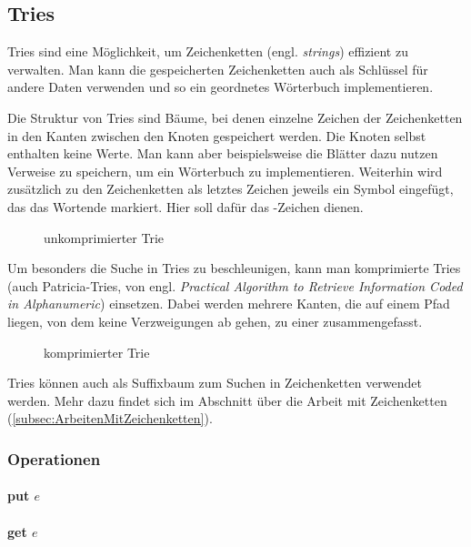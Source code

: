 \subsection{Tries}
\label{subsec:Tries}

Tries sind eine Möglichkeit, um Zeichenketten (engl. \textit{strings}) effizient zu verwalten.
Man kann die gespeicherten Zeichenketten auch als Schlüssel für andere Daten verwenden und so ein geordnetes Wörterbuch implementieren.

Die Struktur von Tries sind Bäume, bei denen einzelne Zeichen der Zeichenketten in den Kanten zwischen den Knoten gespeichert werden.
Die Knoten selbst enthalten keine Werte.
Man kann aber beispielsweise die Blätter dazu nutzen Verweise zu speichern, um ein Wörterbuch zu implementieren.
Weiterhin wird zusätzlich zu den Zeichenketten als letztes Zeichen jeweils ein Symbol eingefügt, das das Wortende markiert.
Hier soll dafür das \EURdig-Zeichen dienen.

\begin{figure}[h]%
\caption{unkomprimierter Trie}
\label{fig:UnkomprimierterTrie}
\end{figure}

Um besonders die Suche in Tries zu beschleunigen, kann man komprimierte Tries (auch Patricia-Tries, von engl. \textit{Practical Algorithm to Retrieve Information Coded in Alphanumeric}) einsetzen.
Dabei werden mehrere Kanten, die auf einem Pfad liegen, von dem keine Verzweigungen ab gehen, zu einer zusammengefasst.

\begin{figure}[h]%
\caption{komprimierter Trie}
\label{fig:KomprimierterTrie}
\end{figure}

Tries können auch als Suffixbaum zum Suchen in Zeichenketten verwendet werden.
Mehr dazu findet sich im Abschnitt über die Arbeit mit Zeichenketten (\ref{subsec:ArbeitenMitZeichenketten}).

\subsubsection{Operationen}

\paragraph{put $e$}
\paragraph{get $e$}
